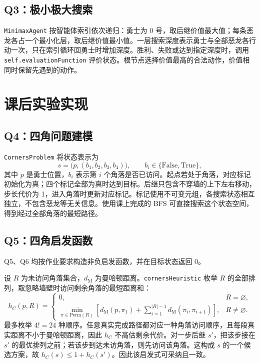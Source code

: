 \documentclass[UTF8,fontset=fandol,a4paper,11pt]{ctexart}
\newcommand{\code}[1]{\texttt{#1}}
\newcommand{\md}{d_{\mathrm{M}}}
\begin{document}
\subsection{Q3：极小极大搜索}

\code{MinimaxAgent} 按智能体索引依次递归：勇士为 0 号，取后继价值最大值；每条恶龙各占一个最小化层，取后继价值最小值。一层搜索深度表示勇士与全部恶龙各行动一次，只在索引循环回勇士时增加深度。胜利、失败或达到指定深度时，调用 \code{self.evaluationFunction} 评价状态。根节点选择价值最高的合法动作，价值相同时保留先遇到的动作。

\section{课后实验实现}

\subsection{Q4：四角问题建模}

\code{CornersProblem} 将状态表示为
\[
  s=\bigl(p,(b_1,b_2,b_3,b_4)\bigr),\qquad b_i\in\{\mathrm{False},\mathrm{True}\},
\]
其中 $p$ 是勇士位置，$b_i$ 表示第 $i$ 个角落是否已访问。起点若处于角落，对应标记初始化为真；四个标记全部为真时达到目标。后继只包含不穿墙的上下左右移动，步长代价为 1，进入角落时更新对应标记。标记使用不可变元组，各搜索状态相互独立，不包含恶龙等无关信息。使用课上完成的 BFS 可直接搜索这个状态空间，得到经过全部角落的最短路径。

\newpage
\subsection{Q5：四角启发函数}

Q5、Q6 均按作业要求构造非负启发函数，并在目标状态返回 0。

设 $R$ 为未访问角落集合，$\md$ 为曼哈顿距离。\code{cornersHeuristic} 枚举 $R$ 的全部排列，取忽略墙壁时访问剩余角落的最短距离和：
\[
  h_C(p,R)=
  \begin{cases}
    0, & R=\varnothing,\\[2pt]
    \displaystyle\min_{\pi\in\mathrm{Perm}(R)}
    \left[\md(p,\pi_1)+\sum_{i=1}^{|R|-1}\md(\pi_i,\pi_{i+1})\right],
    & R\ne\varnothing.
  \end{cases}
\]
最多枚举 $4!=24$ 种顺序。任意真实完成路径都对应一种角落访问顺序，且每段真实距离不小于曼哈顿距离，因此 $h_C$ 不高估剩余代价。对一步后继 $s'$，把该步接在 $s'$ 的最优排列之前；若该步到达未访角落，则先访问该角落。这构成 $s$ 的一个候选方案，故 $h_C(s)\leq1+h_C(s')$。因此该启发式可采纳且一致。
\end{document}
